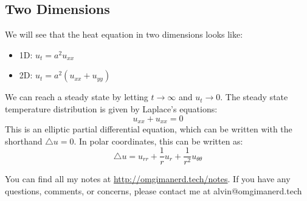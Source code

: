 \documentclass{math}
\begin{document}
\subsection*{Two Dimensions}
We will see that the heat equation in two dimensions looks like:
\begin{itemize}
  \item 1D: \( u_t = a^2u_{xx} \)
  \item 2D: \( u_t = a^2(u_{xx}+u_{yy}) \)
\end{itemize}
We can reach a steady state by letting \( t\to\infty \) and \( u_t\to0 \).
The steady state temperature distribution is given by Laplace's equations:
\[ u_{xx}+u_{xx} = 0 \]
This is an elliptic partial differential equation, which can be written with
the shorthand \( \triangle u = 0 \). In polar coordinates, this can be written
as:
\[ \triangle u = u_{rr}+\frac{1}{r}u_r+\frac{1}{r^2}u_{\theta\theta} \]

\begin{center}
  You can find all my notes at \url{http://omgimanerd.tech/notes}. If you have
  any questions, comments, or concerns, please contact me at
  alvin@omgimanerd.tech
\end{center}
\end{document}
